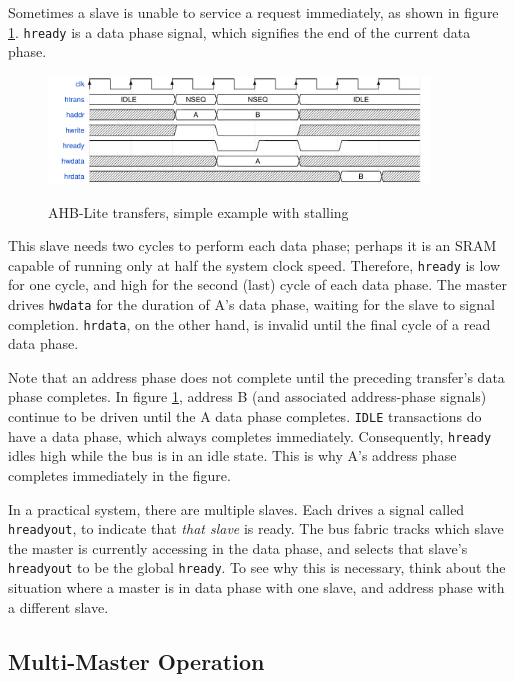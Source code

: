 Sometimes a slave is unable to service a request immediately, as shown in figure \ref{diagram:ahbl_basic_stall}. {\tt hready} is a data phase signal, which signifies the end of the current data phase.

\begin{figure}[H]
\centering
\caption{AHB-Lite transfers, simple example with stalling}
\includegraphics[width=0.9\textwidth]{waves/ahbl_basic_stall.pdf}
\label{diagram:ahbl_basic_stall}
\end{figure}

This slave needs two cycles to perform each data phase; perhaps it is an SRAM capable of running only at half the system clock speed. Therefore, {\tt hready} is low for one cycle, and high for the second (last) cycle of each data phase. The master drives {\tt hwdata} for the duration of A's data phase, waiting for the slave to signal completion. {\tt hrdata}, on the other hand, is invalid until the final cycle of a read data phase.

Note that an address phase does not complete until the preceding transfer's data phase completes. In figure \ref{diagram:ahbl_basic_stall}, address B (and associated address-phase signals) continue to be driven until the A data phase completes. {\tt IDLE} transactions do have a data phase, which always completes immediately. Consequently, {\tt hready} idles high while the bus is in an idle state. This is why A's address phase completes immediately in the figure.

In a practical system, there are multiple slaves. Each drives a signal called {\tt hreadyout}, to indicate that {\it that slave} is ready. The bus fabric tracks which slave the master is currently accessing in the data phase, and selects that slave's {\tt hreadyout} to be the global {\tt hready}. To see why this is necessary, think about the situation where a master is in data phase with one slave, and address phase with a different slave.

\subsection{Multi-Master Operation}

